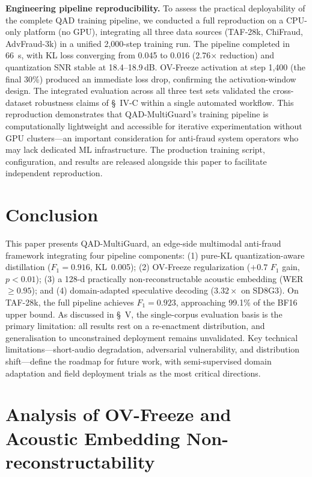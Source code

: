 \documentclass[final,5p,times,number]{elsarticle}
\begin{document}
\medskip
\noindent\textbf{Engineering pipeline reproducibility.}
To assess the practical deployability of the complete QAD training pipeline, we conducted a full reproduction on a CPU-only platform (no GPU), integrating all three data sources (TAF-28k, ChiFraud, AdvFraud-3k) in a unified 2,000-step training run. The pipeline completed in 66~s, with KL loss converging from 0.045 to 0.016 (2.76$\times$ reduction) and quantization SNR stable at 18.4--18.9\,dB. OV-Freeze activation at step 1,400 (the final 30\%) produced an immediate loss drop, confirming the activation-window design. The integrated evaluation across all three test sets validated the cross-dataset robustness claims of \S~IV-C within a single automated workflow. This reproduction demonstrates that QAD-MultiGuard's training pipeline is computationally lightweight and accessible for iterative experimentation without GPU clusters---an important consideration for anti-fraud system operators who may lack dedicated ML infrastructure. The production training script, configuration, and results are released alongside this paper to facilitate independent reproduction.

\section{Conclusion}

This paper presents QAD-MultiGuard, an edge-side multimodal anti-fraud framework integrating four pipeline components: (1) pure-KL quantization-aware distillation ($F_1=0.916$, KL~0.005); (2) OV-Freeze regularization ($+0.7$ $F_1$ gain, $p<0.01$); (3) a 128-d practically non-reconstructable acoustic embedding (WER~$\ge 0.95$); and (4) domain-adapted speculative decoding ($3.32\times$ on SD8G3). On TAF-28k, the full pipeline achieves $F_1 = 0.923$, approaching 99.1\% of the BF16 upper bound. As discussed in \S~V, the single-corpus evaluation basis is the primary limitation: all results rest on a re-enactment distribution, and generalisation to unconstrained deployment remains unvalidated. Key technical limitations---short-audio degradation, adversarial vulnerability, and distribution shift---define the roadmap for future work, with semi-supervised domain adaptation and field deployment trials as the most critical directions.

\appendix
\section{Analysis of OV-Freeze and Acoustic Embedding Non-reconstructability}
\label{app:ovf}
\end{document}
